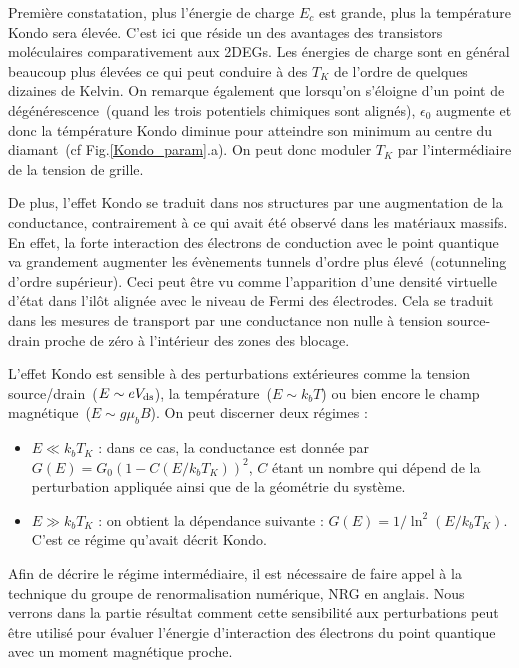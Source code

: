 Première constatation, plus l'énergie de charge $E_c$ est grande, plus la température Kondo sera élevée. C'est ici que réside un des avantages des transistors moléculaires comparativement aux 2DEGs. Les énergies de charge sont en général beaucoup plus élevées ce qui peut conduire à des $T_K$ de l'ordre de quelques dizaines de Kelvin. On remarque également que lorsqu'on s'éloigne d'un point de dégénérescence~(quand les trois potentiels chimiques sont alignés), $\epsilon_0$ augmente et donc la témpérature Kondo diminue pour atteindre son minimum au centre du diamant~(cf Fig.\ref{Kondo_param}.a). On peut donc moduler $T_K$ par l'intermédiaire de la tension de grille.

De plus, l'effet Kondo se traduit dans nos structures par une augmentation de la conductance, contrairement à ce qui avait été observé dans les matériaux massifs. En effet, la forte interaction des électrons de conduction avec le point quantique va grandement augmenter les évènements tunnels d'ordre plus élevé~(cotunneling d'ordre supérieur). Ceci peut être vu comme l'apparition d'une densité virtuelle d'état dans l'ilôt alignée avec le niveau de Fermi des électrodes. Cela se traduit dans les mesures de transport par une conductance non nulle à tension source-drain proche de zéro à l'intérieur des zones des blocage. 

L'effet Kondo est sensible à des perturbations extérieures comme la tension source/drain~($E \sim eV_{\rm{ds}}$), la température~($E \sim k_bT$) ou bien encore le champ magnétique~($E \sim g \mu_bB$). On peut discerner deux régimes :
\begin{itemize}
\item $E \ll k_bT_K$ : dans ce cas, la conductance est donnée par $G(E) = G_0(1-C (E/k_bT_K))^2$, $C$ étant un nombre qui dépend de la perturbation appliquée ainsi que de la géométrie du système.
\item $E \gg k_bT_K$ : on obtient la dépendance suivante : $G(E) = 1/\ln^2(E/k_bT_K)$. C'est ce régime qu'avait décrit Kondo.
\end{itemize}
Afin de décrire le régime intermédiaire, il est nécessaire de faire appel à la technique du groupe de renormalisation numérique, NRG en anglais. Nous verrons dans la partie résultat comment cette sensibilité aux perturbations peut \^etre utilisé pour évaluer l'énergie d'interaction des électrons du point quantique avec un moment magnétique proche.